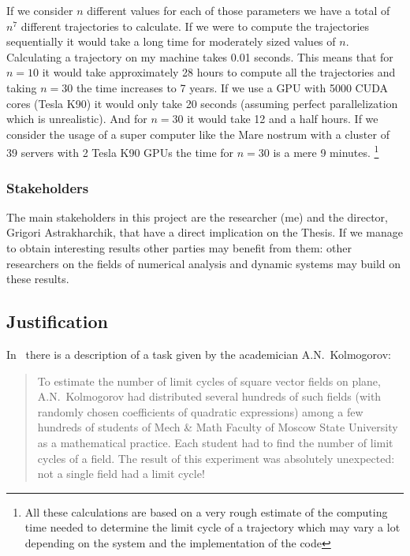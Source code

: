If we consider $n$ different values for each of those parameters we have a total
of $n^7$ different trajectories to calculate. If we were to compute the
trajectories sequentially it would take a long time for moderately sized values
of $n$. Calculating a trajectory on my machine takes 0.01 seconds. This means
that for $n=10$ it would take approximately 28 hours to compute all the
trajectories and taking $n=30$ the time increases to 7 years. If we use a GPU
with 5000 CUDA cores (Tesla K90) it would only take 20 seconds (assuming perfect
parallelization which is unrealistic). And for $n=30$ it would take 12 and a
half hours. If we consider the usage of a super computer like the Mare nostrum
with a cluster of 39 servers with 2 Tesla K90 GPUs the time for $n=30$ is a mere
9 minutes. \footnote{All these calculations are based on a very rough estimate
of the computing time needed to determine the limit cycle of a trajectory which
may vary a lot depending on the system and the implementation of the code}

\subsubsection{Stakeholders}

The main stakeholders in this project are the researcher (me) and the director,
Grigori Astrakharchik, that have a direct implication on the Thesis. If we manage
to obtain interesting results other parties may benefit from them: other
researchers on the fields of numerical analysis and dynamic systems may build on
these results.

\pagebreak
\subsection{Justification}

In~\cite{kuznetsov_visualization_2013} there is a description of a task given by
the academician A.N.~Kolmogorov:

\begin{quote}
To estimate the number of limit cycles of square vector fields on plane,
A.N.~Kolmogorov had distributed several hundreds of such fields (with randomly
chosen coefficients of quadratic expressions) among a few hundreds of students
of Mech \& Math Faculty of Moscow State University as a mathematical practice.
Each student had to find the number of limit cycles of a field. The result of
this experiment was absolutely unexpected: not a single field had a limit cycle!
\end{quote}

